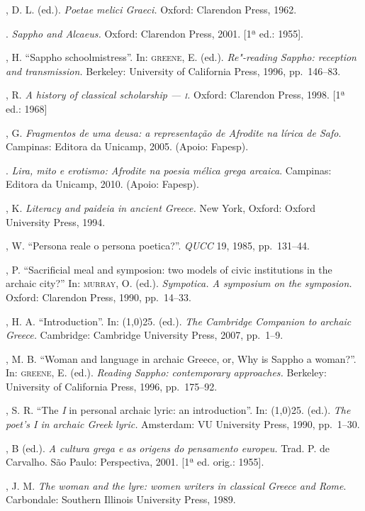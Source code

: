 \begin{bibliohedra}
, D. L. (ed.). \textit{Poetae melici Graeci.} Oxford: Clarendon
Press, 1962.

\titidem. \textit{Sappho and Alcaeus.} Oxford: Clarendon
Press, 2001. [1ª ed.: 1955].

, H. “Sappho schoolmistress”. In: \textsc{greene}, E. (ed.).
\textit{Re"-reading Sappho: reception and transmission.} Berkeley: University of
California Press, 1996, pp.~146--83.

, R. \textit{A history of classical scholarship --- \textsc{i}.} Oxford:
Clarendon Press, 1998. [1ª ed.: 1968]

, G. \textit{Fragmentos de uma deusa: a representação de Afrodite
na lírica de Safo}. Campinas: Editora da Unicamp, 2005. (Apoio: Fapesp).

\titidem. \textit{Lira, mito e erotismo: Afrodite na poesia mélica grega
arcaica}. Campinas: Editora da Unicamp, 2010. (Apoio: Fapesp).

, K. \textit{Literacy and paideia in ancient Greece.} New York,
Oxford: Oxford University Press, 1994.

, W. “Persona reale o persona poetica?”. \textit{QUCC} 19, 1985,
pp.~131--44.

, P. “Sacrificial meal and symposion: two models of
civic institutions in the archaic city?” In: \textsc{murray}, O. (ed.).
\textit{Sympotica. A symposium on the symposion.} Oxford: Clarendon Press,
1990, pp.~14--33.

, H. A. “Introduction”. In: \line(1,0){25}.
(ed.). \textit{The Cambridge Companion to archaic Greece.} Cambridge: Cambridge
University Press, 2007, pp.~1--9.

, M. B. “Woman and language in archaic Greece, or, Why is Sappho
a woman?”. In: \textsc{greene}, E. (ed.). \textit{Reading Sappho: contemporary
approaches.} Berkeley: University of California Press, 1996, pp.~175--92.

, S. R. “The \textit{I} in personal archaic lyric: an
introduction”. In: \line(1,0){25}. (ed.). \textit{The poet’s I in archaic Greek
lyric.} Amsterdam: VU University Press, 1990, pp.~1--30.

, B (ed.). \textit{A cultura grega e as origens do pensamento
europeu.} Trad. P. de Carvalho. São Paulo: Perspectiva, 2001. [1ª ed. orig.:
1955].

, J. M. \textit{The woman and the lyre: women writers in
classical Greece and Rome}. Carbondale: Southern Illinois University Press,
1989.


\end{bibliohedra}
